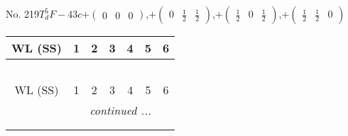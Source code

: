 \documentclass[fleqn,9pt,landscape]{jsarticle}
\begin{document}
\newpage
No. 219\quad$T_{d}^{5}$\quad$F-43c$\quad[ cubic ]\quad$+\begin{pmatrix} 0 & 0 & 0 \end{pmatrix}$,\quad $+\begin{pmatrix} 0 & \frac{1}{2} & \frac{1}{2} \end{pmatrix}$,\quad $+\begin{pmatrix} \frac{1}{2} & 0 & \frac{1}{2} \end{pmatrix}$,\quad $+\begin{pmatrix} \frac{1}{2} & \frac{1}{2} & 0 \end{pmatrix}$
\begin{center}
\renewcommand{\arraystretch}{1.2}
\begin{longtable}{ccccccc}
 \hline \hline
WL (SS) & 1 & 2 & 3 & 4 & 5 & 6 \\ \hline \endfirsthead

\multicolumn{6}{l}{\tablename\ \thetable{}} \\
 \hline \hline
WL (SS) & 1 & 2 & 3 & 4 & 5 & 6 \\ \hline \endhead

 \hline \hline
\multicolumn{6}{r}{\footnotesize\it continued ...} \\ \endfoot

 \hline \hline
\multicolumn{6}{r}{} \\ \endlastfoot


\end{longtable}
\end{center}
\end{document}
